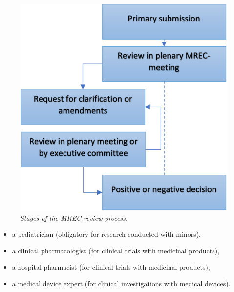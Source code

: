 \documentclass[authordate, meta]{jote-new-article}
\begin{document}
\begin{figure}[b!]
  \begin{fullwidth}
    \includegraphics[width=\linewidth]{media/Picture1.png}

    \caption{\emph{Stages of the MREC review process.}}
  \end{fullwidth}
\end{figure}
\begin{itemize}

  \newpage


  \item a pediatrician (obligatory for research conducted with minors),



  \item
        a clinical pharmacologist (for clinical trials with medicinal products),



  \item a hospital pharmacist (for clinical trials with medicinal products),



  \item
        a medical device expert (for clinical investigations with medical devices).


\end{itemize}
\end{document}
